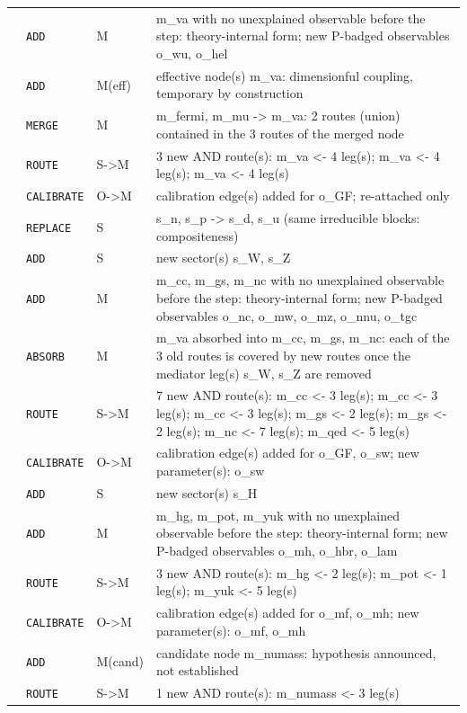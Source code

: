 \begin{longtable}{@{}p{0.6cm}p{1.9cm}p{1.3cm}p{10.5cm}@{}}
\addlinespace[2pt]
8 & \texttt{ADD} & M & m\_va with no unexplained observable before the step: theory-internal form; new P-badged observables o\_wu, o\_hel \\
 & \texttt{ADD} & M(eff) & effective node(s) m\_va: dimensionful coupling, temporary by construction \\
 & \texttt{MERGE} & M & m\_fermi, m\_mu -> m\_va: 2 routes (union) contained in the 3 routes of the merged node \\
 & \texttt{ROUTE} & S->M & 3 new AND route(s): m\_va <- 4 leg(s); m\_va <- 4 leg(s); m\_va <- 4 leg(s) \\
 & \texttt{CALIBRATE} & O->M & calibration edge(s) added for o\_GF; re-attached only \\
\addlinespace[2pt]
9 & \texttt{REPLACE} & S & s\_n, s\_p -> s\_d, s\_u (same irreducible blocks: compositeness) \\
 & \texttt{ADD} & S & new sector(s) s\_W, s\_Z \\
 & \texttt{ADD} & M & m\_cc, m\_gs, m\_nc with no unexplained observable before the step: theory-internal form; new P-badged observables o\_nc, o\_mw, o\_mz, o\_nnu, o\_tgc \\
 & \texttt{ABSORB} & M & m\_va absorbed into m\_cc, m\_gs, m\_nc: each of the 3 old routes is covered by new routes once the mediator leg(s) s\_W, s\_Z are removed \\
 & \texttt{ROUTE} & S->M & 7 new AND route(s): m\_cc <- 3 leg(s); m\_cc <- 3 leg(s); m\_cc <- 3 leg(s); m\_gs <- 2 leg(s); m\_gs <- 2 leg(s); m\_nc <- 7 leg(s); m\_qed <- 5 leg(s) \\
 & \texttt{CALIBRATE} & O->M & calibration edge(s) added for o\_GF, o\_sw; new parameter(s): o\_sw \\
\addlinespace[2pt]
10 & \texttt{ADD} & S & new sector(s) s\_H \\
 & \texttt{ADD} & M & m\_hg, m\_pot, m\_yuk with no unexplained observable before the step: theory-internal form; new P-badged observables o\_mh, o\_hbr, o\_lam \\
 & \texttt{ROUTE} & S->M & 3 new AND route(s): m\_hg <- 2 leg(s); m\_pot <- 1 leg(s); m\_yuk <- 5 leg(s) \\
 & \texttt{CALIBRATE} & O->M & calibration edge(s) added for o\_mf, o\_mh; new parameter(s): o\_mf, o\_mh \\
\addlinespace[2pt]
11 & \texttt{ADD} & M(cand) & candidate node m\_numass: hypothesis announced, not established \\
 & \texttt{ROUTE} & S->M & 1 new AND route(s): m\_numass <- 3 leg(s) \\

\end{longtable}
